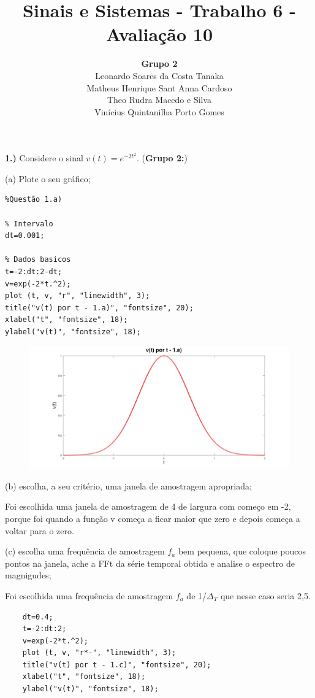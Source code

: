 \documentclass[10pt]{article}
\title{Sinais e Sistemas - Trabalho 6 - Avaliação 10}
\author{
    \textbf{Grupo 2}\\
    Leonardo Soares da Costa Tanaka\\
    Matheus Henrique Sant Anna Cardoso\\
    Theo Rudra Macedo e Silva\\
    Vinícius Quintanilha Porto Gomes
}
\date{}
\begin{document}
\maketitle
\thispagestyle{capa}
\newpage

\textbf{1.)} Considere o sinal $v(t) = e^{-2t^2}$. (\textbf{Grupo 2:})

(a) Plote o seu gráfico;

\begin{verbatim}
%Questão 1.a)

% Intervalo
dt=0.001;

% Dados basicos
t=-2:dt:2-dt;
v=exp(-2*t.^2);
plot (t, v, "r", "linewidth", 3);
title("v(t) por t - 1.a)", "fontsize", 20);
xlabel("t", "fontsize", 18);
ylabel("v(t)", "fontsize", 18);
\end{verbatim}

\begin{figure}[h]
    \includegraphics[scale=0.2]{questao1a}
    \centering
\end{figure}

(b) escolha, a seu critério, uma janela de amostragem apropriada;

\vspace{\baselineskip}
Foi escolhida uma janela de amostragem de 4 de largura com começo em -2, porque foi quando a função v começa a ficar maior que zero e depois começa a voltar para o zero.
\vspace{\baselineskip}

(c) escolha uma frequência de amostragem $f_a$ bem pequena, que coloque poucos pontos na janela, ache a FFt da série temporal obtida e analise o espectro de magnigudes;

\vspace{\baselineskip}
Foi escolhida uma frequência de amostragem $f_a$ de 1/$\Delta_T$ que nesse caso seria 2,5.

\begin{verbatim}
    dt=0.4;
    t=-2:dt:2;
    v=exp(-2*t.^2);
    plot (t, v, "r*-", "linewidth", 3);
    title("v(t) por t - 1.c)", "fontsize", 20);
    xlabel("t", "fontsize", 18);
    ylabel("v(t)", "fontsize", 18);
\end{verbatim}
\end{document}
